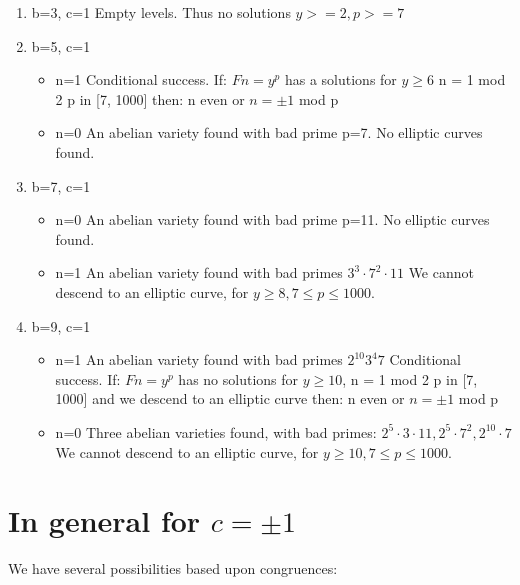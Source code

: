 \documentclass[12pt]{article}
\begin{document}
\begin{enumerate}
\item{b=3, c=1}
  Empty levels. Thus no solutions $y >= 2, p >= 7$
    
\item{b=5, c=1} 
\begin{itemize} 
  \item{n=1}
    Conditional success. If:
      $Fn = y^p$ has a solutions for $y \geq 6$ n = 1 mod 2 p in [7, 1000]
    then:
      n even or $n = \pm 1$ mod p
  \item{n=0}
    An abelian variety found with bad prime p=7.
    No elliptic curves found.
\end{itemize}  
\item{b=7, c=1}
\begin{itemize}
  \item{n=0}
    An abelian variety found with bad prime p=11.
    No elliptic curves found.
  \item{n=1}
    An abelian variety found with bad primes $3^3 \cdot 7^2 \cdot 11$
    We cannot descend to an elliptic curve,
      for $y \geq 8, 7 \leq p \leq 1000$.
\end{itemize}
\item{b=9, c=1}
\begin{itemize}
  
  \item{n=1}
    An abelian variety found with bad primes $2^{10} 3^4 7$
    Conditional success. If:
      $Fn = y^p$ has no solutions for $y \geq 10$, n = 1 mod 2 p in [7, 1000]
      and
      we descend to an elliptic curve
    then:
      n even or $n = \pm 1$ mod p
  \item{n=0}
    Three abelian varieties found, with bad primes:	
      $2^5 \cdot 3 \cdot 11, 2^5 \cdot 7^2, 2^{10} \cdot 7$
    We cannot descend to an elliptic curve,
      for $y \geq 10, 7 \leq p \leq 1000$.

\end{itemize}
\end{enumerate}

\section{In general for $c = \pm 1$}

We have several possibilities based upon congruences:
\end{document}
